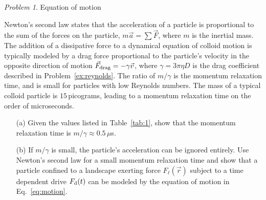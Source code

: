 \documentclass[preprint,showpacs,preprintnumbers,amsmath,amssymb,aps,prb]{revtex4-1}
\theoremstyle{remark}
\newtheorem{problem}{Problem}
\begin{document}
\begin{problem}{Equation of motion}
  \label{ex:n2l}

\noindent Newton's second law states that
  the acceleration of a particle 
  is proportional to 
  the sum of the forces on the particle, $m \vec{a} = \sum \vec{F}$,
  where $m$ is the
  inertial mass.  
  The addition of a dissipative force to a dynamical equation 
  of colloid motion 
  is typically modeled
  by a drag force proportional to the particle's velocity
  in the opposite direction of motion 
  $\vec{F}_{\rm drag} = - \gamma \vec{v}$,
  where $\gamma = 3 \pi \eta D$ is the drag coefficient
  described in Problem~\ref{ex:reynolds}.
  The ratio of $m/\gamma$ is 
 the momentum relaxation time,
  and is small for
  particles with low Reynolds numbers.
  The mass of a
  typical colloid particle is $15$\,picograms,
  leading to a momentum relaxation time
  on the order of microseconds.

\begin{enumerate}

\item [(a)] Given  the values listed in Table~\ref{tab:1},
 show that  the momentum relaxation time is 
  $m/\gamma \approx 0.5\,\mu$s. 
  
\item [(b)] If $m/\gamma$ is small, the
  particle's acceleration can be ignored
  entirely.
Use Newton's second law for
  a small momentum relaxation time and
  show that a particle confined to a landscape exerting force
  $F_\ell(\vec{r})$ subject to a time dependent drive $F_{\rm d}(t)$
  can be modeled by the equation of motion  in 
  Eq.~\eqref{eq:motion}.
  \end{enumerate}
\end{problem}

\end{document}
